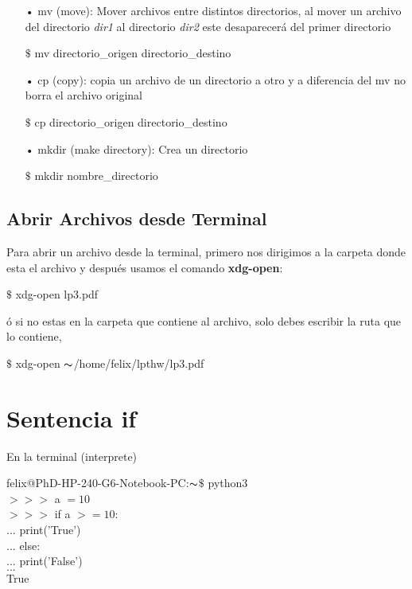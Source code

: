 \documentclass[12pt,openany]{scrbook}
\begin{document}
\begin{itemize}
\item[•] mv (move): Mover archivos entre distintos directorios, al mover un archivo del directorio \textit{dir1} al directorio \textit{dir2} este desaparecer\'a del primer directorio

\hspace{1cm}	$\$$ mv directorio\_origen directorio\_destino

\item[•] cp (copy): copia un archivo de un directorio a otro y a diferencia del mv no borra el
archivo original

\hspace{1cm} $\$$ cp directorio\_origen directorio\_destino 

\item[•] mkdir (make directory): Crea un directorio

\hspace{1cm} $\$$ mkdir nombre\_directorio


\end{itemize}	


\subsection{Abrir Archivos desde Terminal}
Para abrir un archivo desde la terminal, primero nos
dirigimos a la carpeta donde esta el archivo y despu\'es
usamos el comando \textbf{xdg-open}:

\hspace{1cm} $\$$ xdg-open lp3.pdf

\'o si no estas en la carpeta que contiene al archivo, 
solo debes escribir la ruta que lo contiene, 

\hspace{1cm} $\$$ xdg-open $\thicksim$/home/felix/lpthw/lp3.pdf







\section{Sentencia if}

En la terminal (interprete)

felix@PhD-HP-240-G6-Notebook-PC:$\thicksim$\vspace{0cm}$\$$   python3 \\
$>>>$ a $= 10$ \\
$>>>$ if a $>= 10$: \\
$...$ \qquad \quad print('True') \\
$...$ else: \\
$...$  \qquad \quad print('False') \\
$...$ \\
True
\end{document}
